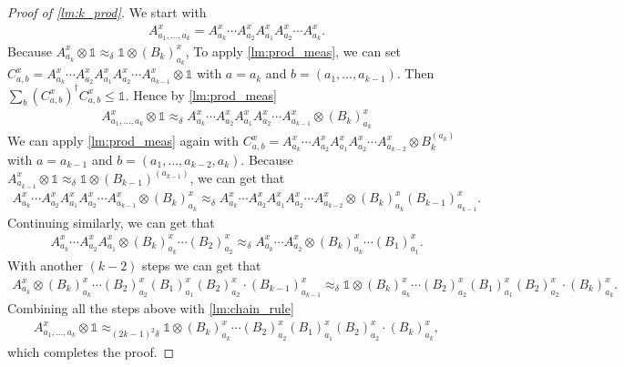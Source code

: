 \documentclass[11pt]{article}
\theoremstyle{plain}
\theoremstyle{definition}
\newcommand {\id} {\ensuremath{\mathds{1}}}
\newcommand{\x}{\otimes}
\newcommand{\ct}{^{\dagger}}
\newcommand{\appd}[1]{\approx_{#1}}
\newcommand{\1}{\mathbb{1}} %
\begin{document}
\begin{proof}[Proof of \cref{lm:k_prod}]
	We start with 
	\begin{align*}
		A^x_{a_1, \ldots, a_k} = A^x_{a_k} \cdots A^x_{a_2} A^x_{a_1} A^x_{a_2} \cdots A^x_{a_k}.
	\end{align*}
	Because $A^x_{a_k} \x \id \appd{\delta} \id \x (B_k)^x_{a_k}$, 
	To apply \cref{lm:prod_meas}, 
	we can set $C^x_{a,b} = 
	A^x_{a_k} \cdots A^x_{a_2} A^x_{a_1} A^x_{a_2} \cdots A^x_{a_{k-1}} \x \id$ 
	with $a = a_k$ and $b = (a_1, \ldots, a_{k-1})$.
	Then $\sum_b (C^x_{a,b})\ct C^x_{a,b} \leq \id$.
	Hence by \cref{lm:prod_meas}
	\begin{align*}
		A^x_{a_1, \ldots, a_k} \x \id \appd{\delta} A^x_{a_k} \cdots A^x_{a_2} A^x_{a_1} A^x_{a_2} \cdots A^x_{a_{k-1}} \x (B_k)^x_{a_k}
	\end{align*}
	We can apply \cref{lm:prod_meas} again with $C^x_{a,b} = A^x_{a_k} \cdots A^x_{a_2} A^x_{a_1} A^x_{a_2} \cdots A^x_{a_{k-2}} \x B_k^{(a_k)}$ with $a= a_{k-1}$ and $b = (a_1,\ldots, a_{k-2}, a_k)$.
	Because $A^x_{a_{k-1}} \x \id \appd{\delta} \id \x (B_{k-1})^{(a_{k-1})}$, we can get that
	\begin{align*}
		A^x_{a_k} \cdots A^x_{a_2} A^x_{a_1} A^x_{a_2} \cdots A^x_{a_{k-1}} \x (B_k)^x_{a_k}
		\appd{\delta} A^x_{a_k} \cdots A^x_{a_2} A^x_{a_1} A^x_{a_2} \cdots A^x_{a_{k-2}}  \x (B_k)^x_{a_k}(B_{k-1})^x_{a_{k-1}}.
	\end{align*}
	Continuing similarly, we can get that
	\begin{align*}
	A^x_{a_k} \cdots A^x_{a_2} A^x_{a_1} \x  (B_k)^x_{a_k} \cdots (B_2)^x_{a_2}
	 \appd{\delta} 
	A^x_{a_k} \cdots A^x_{a_2}  \x (B_k)^x_{a_k} \cdots (B_1)^x_{a_1}.
	\end{align*}
	With another $(k-2)$ steps we can get that 
	\begin{align*}
		A^x_{a_k} \x (B_k)^x_{a_k} \cdots (B_2)^x_{a_2} (B_1)^x_{a_1} (B_2)^x_{a_2} \cdot  (B_{k-1})^x_{a_{k-1}}\appd{\delta}
		\id \x (B_k)^x_{a_k} \cdots (B_2)^x_{a_2} (B_1)^x_{a_1} (B_2)^x_{a_2} \cdot  (B_{k})^x_{a_{k}}. 
	\end{align*}
	Combining all the steps above with \cref{lm:chain_rule}
	\begin{align*}
		A^x_{a_1, \ldots, a_k} \x \id  \appd{(2k-1)^2\delta} \id \x
		(B_k)^x_{a_k} \cdots (B_2)^x_{a_2} (B_1)^x_{a_1} (B_2)^x_{a_2} \cdot  (B_{k})^x_{a_{k}},
	\end{align*}
	which completes the proof.
\end{proof}
\end{document}
